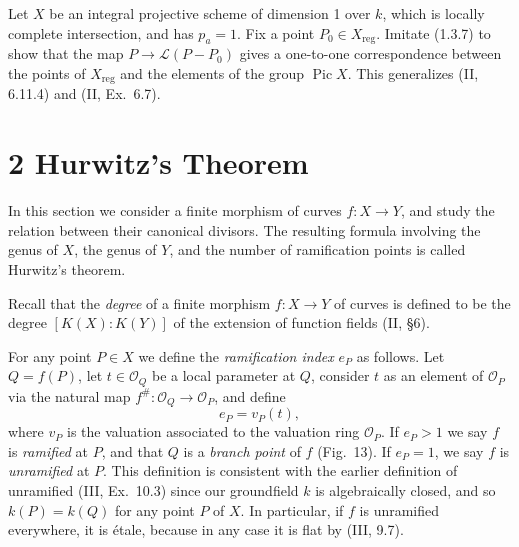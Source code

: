 

\DeclareMathOperator{\Div}{Div}
\DeclareMathOperator{\Pic}{Pic}

\begin{exercise}[1.10]
Let $X$ be an integral projective scheme of dimension 1 over $k$, which is
locally complete intersection, and has $p_a = 1$. Fix a point
$P_0 \in X_{\mathrm{reg}}$. Imitate (1.3.7) to show that the map
$P \to \mathscr{L}(P - P_0)$ gives a one-to-one correspondence between the
points of $X_{\mathrm{reg}}$ and the elements of the group $\Pic X$. This
generalizes (II, 6.11.4) and (II, Ex.\ 6.7).
\end{exercise}

\section*{2 Hurwitz's Theorem}

In this section we consider a finite morphism of curves $f\colon X \to Y$,
and study the relation between their canonical divisors. The resulting
formula involving the genus of $X$, the genus of $Y$, and the number of
ramification points is called Hurwitz's theorem.

Recall that the \emph{degree} of a finite morphism $f\colon X \to Y$ of
curves is defined to be the degree $[K(X)\colon K(Y)]$ of the extension of
function fields (II, \S 6).

For any point $P \in X$ we define the \emph{ramification index} $e_P$ as
follows. Let $Q = f(P)$, let $t \in \mathcal{O}_Q$ be a local parameter at
$Q$, consider $t$ as an element of $\mathcal{O}_P$ via the natural map
$f^\#\colon \mathcal{O}_Q \to \mathcal{O}_P$, and define
\[
  e_P = v_P(t),
\]
where $v_P$ is the valuation associated to the valuation ring
$\mathcal{O}_P$. If $e_P > 1$ we say $f$ is \emph{ramified} at $P$, and that
$Q$ is a \emph{branch point} of $f$ (Fig.\ 13). If $e_P = 1$, we say $f$ is
\emph{unramified} at $P$. This definition is consistent with the earlier
definition of unramified (III, Ex.\ 10.3) since our groundfield $k$ is
algebraically closed, and so $k(P) = k(Q)$ for any point $P$ of $X$. In
particular, if $f$ is unramified everywhere, it is \'etale, because in any
case it is flat by (III, 9.7).

